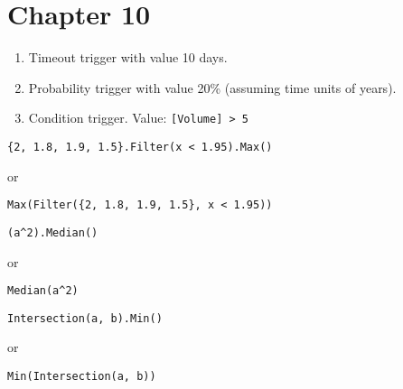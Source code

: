 \documentclass[]{memoir}
\begin{document}
\section{Chapter 10}


\begin{enumerate}
\def\labelenumi{\arabic{enumi}.}
\itemsep1pt\parskip0pt
\item
  Timeout trigger with value 10 days.
\item
  Probability trigger with value 20\% (assuming time units of years).
\item
  Condition trigger. Value: \lstinline![Volume] > 5!
\end{enumerate}


\lstinline!{2, 1.8, 1.9, 1.5}.Filter(x < 1.95).Max()!

or

\lstinline!Max(Filter({2, 1.8, 1.9, 1.5}, x < 1.95))!


\lstinline!(a^2).Median()!

or

\lstinline!Median(a^2)!


\lstinline!Intersection(a, b).Min()!

or

\lstinline!Min(Intersection(a, b))!

\end{document}
